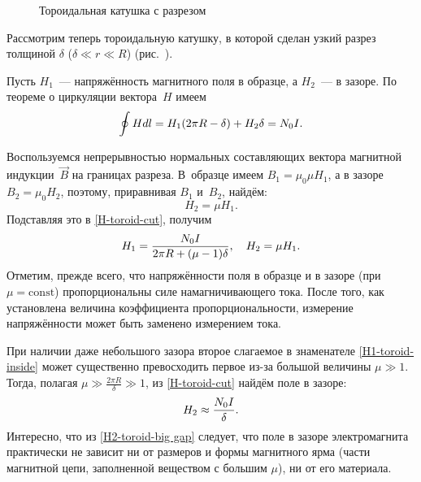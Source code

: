 \begin{wrapfigure}{o}{0.3\textwidth}
    \centering
    \caption{Тороидальная катушка с разрезом}
\end{wrapfigure}

Рассмотрим теперь тороидальную катушку, в которой сделан узкий разрез толщиной
$\delta$ ($\delta \ll r \ll R$) (рис.~).

Пусть $H_1$~--- напряжённость магнитного поля в
образце, а $H_2$~--- в зазоре. По теореме о циркуляции вектора~$H$ имеем
\begin{equation}
	\eqmark{H-toroid-cut}
	\oint {Hdl} = H_1 (2\pi R - \delta) + H_2 \delta  = N_0 I.
\end{equation}

Воспользуемся непрерывностью нормальных составляющих вектора магнитной
индукции~$\vec{B}$ на границах разреза. В~образце имеем $B_1 = \mu_0 \mu H_1$,
а в зазоре $B_2 = \mu_0 H_2$, поэтому, приравнивая $B_1$ и~$B_2$, найдём:
\begin{equation*}H_2 = \mu H_1.\end{equation*}
Подставляя это в \eqref{H-toroid-cut}, получим
\begin{equation}
	\eqmark{H1-toroid-inside}
	H_1 = \frac{N_0 I}{2\pi R + (\mu - 1)\delta},\quad H_2 = \mu H_1.
\end{equation}
Отметим, прежде всего, что напряжённости поля в образце и в зазоре
(при $\mu = \mathrm{const}$) пропорциональны силе намагничивающего тока.
После того, как установлена величина коэффициента
пропорциональности, измерение напряжённости может быть заменено измерением тока.

При наличии даже небольшого зазора второе слагаемое в знаменателе
\eqref{H1-toroid-inside} может существенно превосходить первое из-за большой величины
$\mu\gg1$. Тогда, полагая $\mu\gg \frac{2\pi R}{\delta}\gg 1$, из
\eqref{H-toroid-cut} найдём поле в зазоре:
\begin{equation}
	\eqmark{H2-toroid-big gap}
	H_2 \approx \frac{N_0 I}{\delta}.
\end{equation}
Интересно, что из \eqref{H2-toroid-big gap} следует, что поле в зазоре
электромагнита практически не зависит ни от размеров и формы магнитного ярма (части
магнитной цепи, заполненной веществом с большим $\mu$), ни от его материала.



